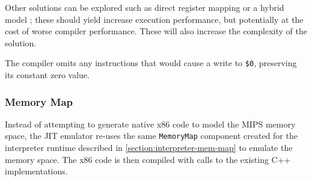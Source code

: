 Other solutions can be explored such as direct register mapping or a hybrid model \cite{mark-probst-dbt}; these should yield increase execution performance, but potentially at the cost of worse compiler performance. These will also increase the complexity of the solution.

The compiler omits any instructions that would cause a write to \texttt{\$0}, preserving its constant zero value.

\subsubsection{Memory Map}

Instead of attempting to generate native x86 code to model the MIPS memory space, the JIT emulator re-uses the same \texttt{MemoryMap} component created for the interpreter runtime described in \autoref{section:interpreter-mem-map} to emulate the memory space. The x86 code is then compiled with calls to the existing C++ implementations.
